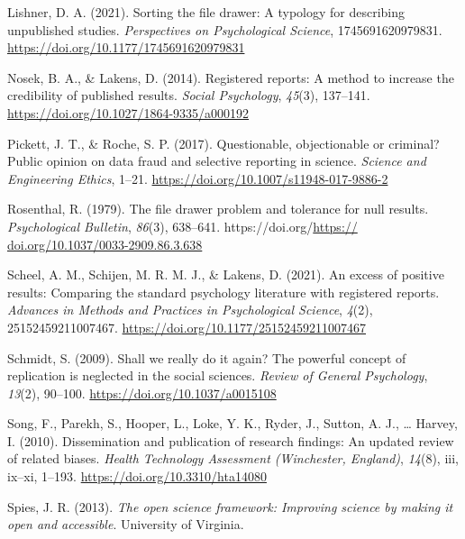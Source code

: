\documentclass[
  ,jou, a4paper,floatsintext]{apa6}
\newlength{\cslhangindent}
\newlength{\cslentryspacingunit} %
\newenvironment{CSLReferences}[2] %
 {%
  \setlength{\parindent}{0pt}
  \ifodd #1
  \let\oldpar\par
  \def\par{\hangindent=\cslhangindent\oldpar}
  \fi
  \setlength{\parskip}{#2\cslentryspacingunit}
 }%
 {}
\begin{document}
\begin{CSLReferences}{1}{0}
\leavevmode{}%
Lishner, D. A. (2021). Sorting the file drawer: {A} typology for describing unpublished studies. \emph{Perspectives on Psychological Science}, 1745691620979831. \url{https://doi.org/10.1177/1745691620979831}

\leavevmode{}%
Nosek, B. A., \& Lakens, D. (2014). Registered reports: {A} method to increase the credibility of published results. \emph{Social Psychology}, \emph{45}(3), 137--141. \url{https://doi.org/10.1027/1864-9335/a000192}

\leavevmode{}%
Pickett, J. T., \& Roche, S. P. (2017). Questionable, objectionable or criminal? {Public} opinion on data fraud and selective reporting in science. \emph{Science and Engineering Ethics}, 1--21. \url{https://doi.org/10.1007/s11948-017-9886-2}

\leavevmode{}%
Rosenthal, R. (1979). The file drawer problem and tolerance for null results. \emph{Psychological Bulletin}, \emph{86}(3), 638--641. https://doi.org/\href{https://\%20doi.org/10.1037/0033-2909.86.3.638}{https:// doi.org/10.1037/0033-2909.86.3.638}

\leavevmode{}%
Scheel, A. M., Schijen, M. R. M. J., \& Lakens, D. (2021). An excess of positive results: {Comparing} the standard psychology literature with registered reports. \emph{Advances in Methods and Practices in Psychological Science}, \emph{4}(2), 25152459211007467. \url{https://doi.org/10.1177/25152459211007467}

\leavevmode{}%
Schmidt, S. (2009). Shall we really do it again? {The} powerful concept of replication is neglected in the social sciences. \emph{Review of General Psychology}, \emph{13}(2), 90--100. \url{https://doi.org/10.1037/a0015108}

\leavevmode{}%
Song, F., Parekh, S., Hooper, L., Loke, Y. K., Ryder, J., Sutton, A. J., \ldots{} Harvey, I. (2010). Dissemination and publication of research findings: An updated review of related biases. \emph{Health Technology Assessment (Winchester, England)}, \emph{14}(8), iii, ix--xi, 1--193. \url{https://doi.org/10.3310/hta14080}

\leavevmode{}%
Spies, J. R. (2013). \emph{The open science framework: {Improving} science by making it open and accessible}. {University of Virginia}.


\end{CSLReferences}
\end{document}
